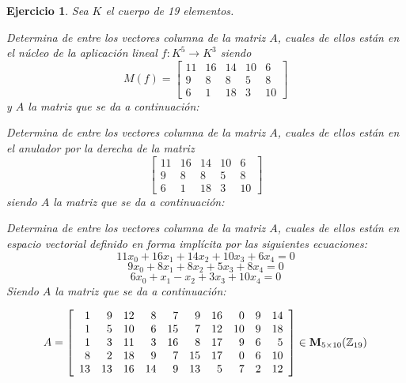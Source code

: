 \documentclass[12pt]{amsart}
\newtheorem{ejer}{Ejercicio}
\begin{document}
\begin{ejer} Sea $K$ el cuerpo de 19 elementos.
\newline
\noindent\begin{minipage}{\textwidth}
\begin{tcolorbox}[colback = green!20!white,title=Versión Núcleo]
Determina de entre los vectores columna de la matriz $A$, cuales de ellos están en el núcleo de la aplicación lineal $f:K^{5} \to K^{3}$ siendo  $$ M(f) = \left[\begin{array}{rrrrr}
11 & 16 & 14 & 10 & 6 \\
9 & 8 & 8 & 5 & 8 \\
6 & 1 & 18 & 3 & 10
\end{array}\right] $$ y $A$ la matriz que se da a continuación:\end{tcolorbox}
\end{minipage} \newline
\noindent\begin{minipage}{\textwidth}
\begin{tcolorbox}[colback = blue!20!white,title=Versión Anulador]
Determina de entre los vectores columna de la matriz $A$, cuales de ellos están en el anulador por la derecha de la matriz $$ \left[\begin{array}{rrrrr}
11 & 16 & 14 & 10 & 6 \\
9 & 8 & 8 & 5 & 8 \\
6 & 1 & 18 & 3 & 10
\end{array}\right] $$ siendo $A$ la matriz que se da a continuación:\end{tcolorbox}
\end{minipage} \newline
\noindent\begin{minipage}{\textwidth} 
\begin{tcolorbox}[colback = red!20!white,title=Versión Ecuaciones Implícitas]
Determina de entre los vectores columna de la matriz $A$, cuales de ellos están en espacio vectorial definido en forma implícita por las siguientes ecuaciones:
\[ 11 x_{0} + 16 x_{1} + 14 x_{2} + 10 x_{3} + 6 x_{4} = 0 \]
\[ 9 x_{0} + 8 x_{1} + 8 x_{2} + 5 x_{3} + 8 x_{4} = 0 \]
\[ 6 x_{0} + x_{1} - x_{2} + 3 x_{3} + 10 x_{4} = 0 \]
Siendo $A$ la matriz que se da a continuación:
\end{tcolorbox}
\end{minipage}
\[ A = \left[\begin{array}{rrrrrrrrrr}
1 & 9 & 12 & 8 & 7 & 9 & 16 & 0 & 9 & 14 \\
1 & 5 & 10 & 6 & 15 & 7 & 12 & 10 & 9 & 18 \\
1 & 3 & 11 & 3 & 16 & 8 & 17 & 9 & 6 & 5 \\
8 & 2 & 18 & 9 & 7 & 15 & 17 & 0 & 6 & 10 \\
13 & 13 & 16 & 14 & 9 & 13 & 5 & 7 & 2 & 12
\end{array}\right] \in {\bf M}_{5\times 10}({\mathbb Z}_{19})\]
\end{ejer}
\end{document}
